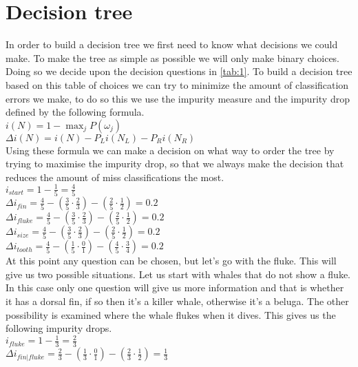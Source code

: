 \documentclass[10pt,a4paper]{article}
\begin{document}
\section{Decision tree}
In order to build a decision tree we first need to know what decisions we could make. To make the tree as simple as possible we will only make binary choices. Doing so we decide upon the decision questions in \autoref{tab:1}. 
To build a decision tree based on this table of choices we can try to minimize the amount of classification errors we make, to do so this we use the impurity measure and the impurity drop defined by the following formula.\\
$i \left ( N \right ) = 1 - \max _{j} P\left ( \omega _{j} \right )$\\
$\Delta i \left ( N \right ) = i \left ( N \right ) - P_{L}i\left ( N_{L} \right ) - P_{R}i\left ( N_{R} \right )$\\
Using these formula we can make a decision on what way to order the tree by trying to maximise the impurity drop, so that we always make the decision that reduces the amount of miss classifications the most.\\
$i_{start} = 1 - \frac{1}{5} = \frac{4}{5} $\\
$\Delta i_{fin} = \frac{4}{5} - \left ( \frac{3}{5}  \cdot \frac{2}{3} \right ) - \left ( \frac{2}{5} \cdot \frac{1}{2}\right ) = 0.2$\\
$\Delta i_{fluke} = \frac{4}{5} - \left ( \frac{3}{5}  \cdot \frac{2}{3} \right ) - \left ( \frac{2}{5} \cdot \frac{1}{2}\right ) = 0.2$\\
$\Delta i_{size} = \frac{4}{5} - \left ( \frac{3}{5}  \cdot \frac{2}{3} \right ) - \left ( \frac{2}{5} \cdot \frac{1}{2}\right ) = 0.2$\\
$\Delta i_{tooth} = \frac{4}{5} - \left ( \frac{1}{5}  \cdot \frac{0}{1} \right ) - \left ( \frac{4}{5} \cdot \frac{3}{4}\right ) = 0.2$\\
At this point any question can be chosen, but let’s go with the fluke.
This will give us two possible situations. Let us start with whales that do not show a fluke. In this case only one question will give us more information and that is whether it has a dorsal fin, if so then it's a killer whale, otherwise it's a beluga.
The other possibility is examined where the whale flukes when it dives. This gives us the following impurity drops.\\
$i_{fluke} = 1 - \frac{1}{3} = \frac{2}{3} $\\
$\Delta i_{fin | fluke} = \frac{2}{3} - \left ( \frac{1}{3}  \cdot \frac{0}{1} \right ) - \left ( \frac{2}{3} \cdot \frac{1}{2}\right ) = \frac{1}{3}$\\
\end{document}
